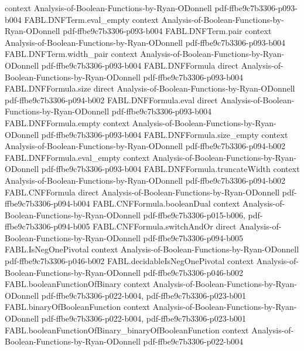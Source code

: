 \begin{theorem}
  {context}
  {Analysis-of-Boolean-Functions-by-Ryan-ODonnell}
  {pdf-ffbe9c7b3306-p093-b004}
\proofstep
  {FABL.DNFTerm.eval_empty}
  {context}
  {Analysis-of-Boolean-Functions-by-Ryan-ODonnell}
  {pdf-ffbe9c7b3306-p093-b004}
\proofstep
  {FABL.DNFTerm.pair}
  {context}
  {Analysis-of-Boolean-Functions-by-Ryan-ODonnell}
  {pdf-ffbe9c7b3306-p093-b004}
\proofstep
  {FABL.DNFTerm.width_pair}
  {context}
  {Analysis-of-Boolean-Functions-by-Ryan-ODonnell}
  {pdf-ffbe9c7b3306-p093-b004}
\proofstep
  {FABL.DNFFormula}
  {direct}
  {Analysis-of-Boolean-Functions-by-Ryan-ODonnell}
  {pdf-ffbe9c7b3306-p093-b004}
\proofstep
  {FABL.DNFFormula.size}
  {direct}
  {Analysis-of-Boolean-Functions-by-Ryan-ODonnell}
  {pdf-ffbe9c7b3306-p094-b002}
\proofstep
  {FABL.DNFFormula.eval}
  {direct}
  {Analysis-of-Boolean-Functions-by-Ryan-ODonnell}
  {pdf-ffbe9c7b3306-p093-b004}
\proofstep
  {FABL.DNFFormula.empty}
  {context}
  {Analysis-of-Boolean-Functions-by-Ryan-ODonnell}
  {pdf-ffbe9c7b3306-p093-b004}
\proofstep
  {FABL.DNFFormula.size_empty}
  {context}
  {Analysis-of-Boolean-Functions-by-Ryan-ODonnell}
  {pdf-ffbe9c7b3306-p094-b002}
\proofstep
  {FABL.DNFFormula.eval_empty}
  {context}
  {Analysis-of-Boolean-Functions-by-Ryan-ODonnell}
  {pdf-ffbe9c7b3306-p093-b004}
\proofstep
  {FABL.DNFFormula.truncateWidth}
  {context}
  {Analysis-of-Boolean-Functions-by-Ryan-ODonnell}
  {pdf-ffbe9c7b3306-p094-b002}
\proofstep
  {FABL.CNFFormula}
  {direct}
  {Analysis-of-Boolean-Functions-by-Ryan-ODonnell}
  {pdf-ffbe9c7b3306-p094-b004}
\proofstep
  {FABL.CNFFormula.booleanDual}
  {context}
  {Analysis-of-Boolean-Functions-by-Ryan-ODonnell}
  {pdf-ffbe9c7b3306-p015-b006,
    pdf-ffbe9c7b3306-p094-b005}
\proofstep
  {FABL.CNFFormula.switchAndOr}
  {direct}
  {Analysis-of-Boolean-Functions-by-Ryan-ODonnell}
  {pdf-ffbe9c7b3306-p094-b005}
\proofstep
  {FABL.IsNegOnePivotal}
  {context}
  {Analysis-of-Boolean-Functions-by-Ryan-ODonnell}
  {pdf-ffbe9c7b3306-p046-b002}
\proofstep
  {FABL.decidableIsNegOnePivotal}
  {context}
  {Analysis-of-Boolean-Functions-by-Ryan-ODonnell}
  {pdf-ffbe9c7b3306-p046-b002}
\proofstep
  {FABL.booleanFunctionOfBinary}
  {context}
  {Analysis-of-Boolean-Functions-by-Ryan-ODonnell}
  {pdf-ffbe9c7b3306-p022-b004,
    pdf-ffbe9c7b3306-p023-b001}
\proofstep
  {FABL.binaryOfBooleanFunction}
  {context}
  {Analysis-of-Boolean-Functions-by-Ryan-ODonnell}
  {pdf-ffbe9c7b3306-p022-b004,
    pdf-ffbe9c7b3306-p023-b001}
\proofstep
  {FABL.booleanFunctionOfBinary_binaryOfBooleanFunction}
  {context}
  {Analysis-of-Boolean-Functions-by-Ryan-ODonnell}
  {pdf-ffbe9c7b3306-p022-b004}

\end{theorem}
